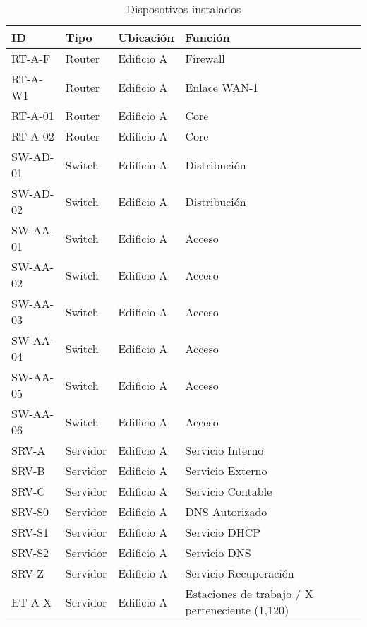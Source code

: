 \documentclass[a4paper,onecolumn,11pt]{article}
\begin{document}
\begin{table}[htbp]
\small \sffamily
\caption{Disposotivos instalados}
\begin{center}
\begin{tabular}{p{}p{}p{}p{}}
\toprule
\textbf{ID} & \textbf{Tipo} & \textbf{Ubicación} & \textbf{Función}\\
\toprule

RT-A-F & Router & Edificio A & Firewall \\\midrule
RT-A-W1 & Router & Edificio A & Enlace WAN-1 \\\midrule
RT-A-01 & Router & Edificio A & Core \\\midrule
RT-A-02 & Router & Edificio A & Core \\\midrule
SW-AD-01 & Switch & Edificio A & Distribución \\\midrule
SW-AD-02 & Switch & Edificio A & Distribución \\\midrule
SW-AA-01 & Switch & Edificio A & Acceso \\\midrule
SW-AA-02 & Switch & Edificio A & Acceso \\\midrule
SW-AA-03 & Switch & Edificio A & Acceso \\\midrule
SW-AA-04 & Switch & Edificio A & Acceso \\\midrule
SW-AA-05 & Switch & Edificio A & Acceso \\\midrule
SW-AA-06 & Switch & Edificio A & Acceso \\\midrule
SRV-A & Servidor & Edificio A & Servicio Interno \\\midrule
SRV-B & Servidor & Edificio A & Servicio Externo \\\midrule
SRV-C & Servidor & Edificio A & Servicio Contable \\\midrule
SRV-S0 & Servidor & Edificio A & DNS Autorizado \\\midrule
SRV-S1 & Servidor & Edificio A & Servicio DHCP \\\midrule
SRV-S2 & Servidor & Edificio A & Servicio DNS \\\midrule
SRV-Z & Servidor & Edificio A & Servicio Recuperación \\\midrule
ET-A-X & Servidor & Edificio A & Estaciones de trabajo / X perteneciente (1,120) \\
\bottomrule

\end{tabular}
\end{center}
\label{tab:devInstalados}
\end{table}
\end{document}
